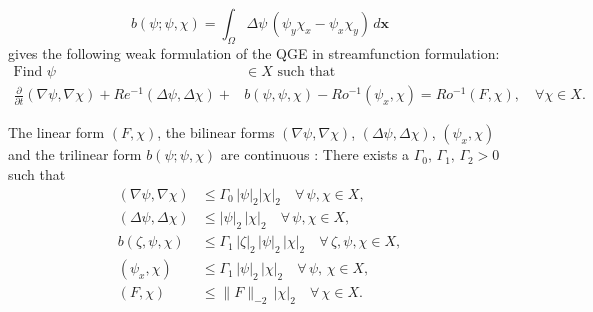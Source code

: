 \begin{equation}
  b(\psi; \psi, \chi) = \int_{\Omega}\! \Delta \psi\, (\psi_y \chi_x - \psi_x
  \chi_y)\, d\mathbf{x}
  \label{eqn:b}
\end{equation}
gives the following weak
formulation of the QGE in streamfunction formulation:
\begin{equation}
  \begin{split}
    \text{Find } \psi &\in X \text{ such that} \\
    \frac{\partial}{\partial t} (\nabla \psi, \nabla \chi) + Re^{-1} (\Delta
      \psi, \Delta \chi) +& b(\psi,\psi,\chi) - Ro^{-1}(\psi_x,\chi)
      = Ro^{-1} (F,\chi),\quad \forall \chi \in X.
  \end{split}
  \label{eqn:QGEWF}
\end{equation}
\begin{lemma} \label{lma:ContinuousForms}
  The linear form $(F,\chi)$, the bilinear forms $(\nabla \psi, \nabla \chi)$,
  $(\Delta \psi, \Delta \chi)$, $(\psi_x, \chi)$ and the trilinear form $b(\psi;
  \psi, \chi)$ are continuous \cite{Cayco86}: There exists a $\Gamma_0,\,
  \Gamma_1,\, \Gamma_2 > 0$ such that
  \begin{align}
    (\nabla \psi, \nabla \chi) &\le \Gamma_0\, |\psi|_2 |\chi|_2 \quad \forall
      \, \psi,\chi\in X, \label{eqn:a0cont} \\
    (\Delta \psi, \Delta \chi) &\le |\psi|_2 \, |\chi|_2 \quad \forall \,
      \psi,\chi\in X , \label{eqn:a1Cont} \\
    b(\zeta,\psi,\chi) &\le \Gamma_1 \, |\zeta|_2 \, |\psi|_2 \, |\chi|_2
      \quad \forall \, \zeta,\psi,\chi\in X , \label{eqn:bCont} \\
    (\psi_x,\chi) &\le \Gamma_1 \, |\psi|_2 \, |\chi|_2 \quad \forall \, \psi,
      \, \chi \in X , \label{eqn:a3Cont} \\
    (F,\chi) &\le \|F\|_{-2} \, |\chi|_2 \quad \forall \, \chi \in X .
      \label{eqn:lCont}
  \end{align}
\end{lemma}
